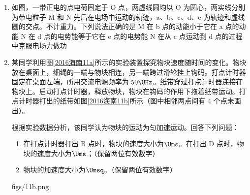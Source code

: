 \documentclass[\gkver]{gaokaozhenti}
\begin{document}
\begin{enumerate}
\item
如图，一带正电的点电荷固定于 O 点，两虚线圆均以 O 为圆心，两实线分别为带电粒子 M 和 N 先后在电场中运动的轨迹，a、b、c、d、e 为轨迹和虚线圆的交点。不计重力。下列说法正确的是
\onepicture[w=4.92cm]{}
{M 在 b 点的动能小于它在 a 点的动能}
{N 在 d 点的电势能等于它在 e 点的电势能}
{N 在从 c 点运动到 d 点的过程中克服电场力做功}

\item
某同学利用图\ref{2016海南11a}所示的实验装置探究物块速度随时间的变化。物块放在桌面上，细绳的一端与物块相连，另一端跨过滑轮挂上钩码。打点计时器固定在桌面左端，所用交流电源频率为 $50\UHz$。纸带穿过打点计时器连接在物块上。启动打点计时器，释放物块，物块在钩码的作用下拖着纸带运动。打点计时器打出的纸带如图\ref{2016海南11b}所示（图中相邻两点间有 4 个点未画出）。

根据实验数据分析，该同学认为物块的运动为匀加速运动。回答下列问题：
\begin{enumerate}
	\item
	在打点计时器打出 B 点时，物块的速度大小为$\Ums$。在打出 D 点时，物块的速度大小为$\Ums$；（保留两位有效数字）
	\item
	物块的加速度大小为$\Umsq$。（保留两位有效数字）
\end{enumerate}
{figs/11b.png}
\end{enumerate}
\end{document}
